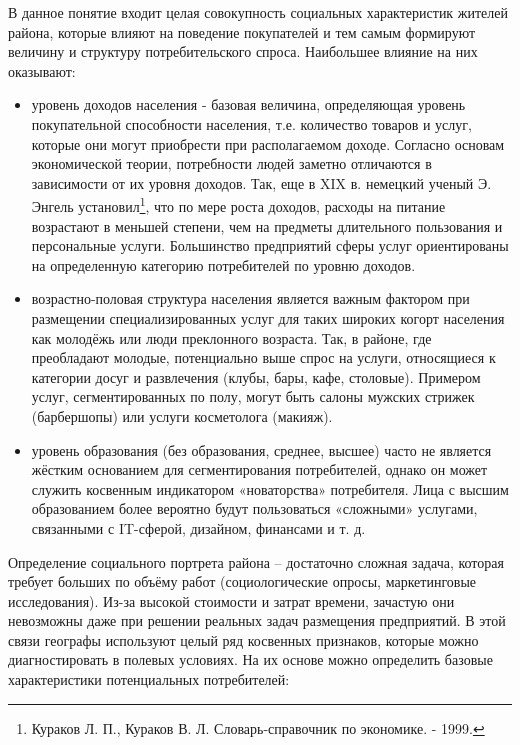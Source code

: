 \documentclass[
  11pt,
  russian,
]{book}
\begin{document}
В данное понятие входит целая совокупность социальных характеристик жителей района, которые влияют на
поведение покупателей и тем самым формируют величину и структуру потребительского спроса. Наибольшее влияние на них оказывают:

\begin{itemize}
\item
  уровень доходов населения - базовая величина, определяющая уровень покупательной способности населения, т.е. количество
  товаров и услуг, которые они могут приобрести при располагаемом доходе.
  Согласно основам экономической теории, потребности людей заметно отличаются в зависимости от их уровня доходов. Так, еще в XIX в.
  немецкий ученый Э. Энгель установил\footnote{Кураков Л. П., Кураков В. Л. Словарь-справочник по экономике. - 1999.}, что по мере роста доходов, расходы на питание возрастают в меньшей степени, чем на предметы длительного пользования и персональные услуги. Большинство предприятий сферы услуг ориентированы на определенную категорию потребителей по уровню доходов.
\item
  возрастно-половая структура населения является важным фактором при размещении специализированных услуг для таких
  широких когорт населения как молодёжь или люди преклонного возраста. Так, в районе, где преобладают молодые, потенциально выше спрос на услуги, относящиеся к категории досуг и развлечения (клубы, бары, кафе, столовые). Примером услуг,
  сегментированных по полу, могут быть салоны мужских стрижек (барбершопы) или услуги косметолога (макияж).
\item
  уровень образования (без образования, среднее, высшее) часто не является жёстким основанием для сегментирования
  потребителей, однако он может служить косвенным индикатором «новаторства» потребителя. Лица с высшим образованием более вероятно будут пользоваться «сложными» услугами, связанными с IT-сферой, дизайном, финансами и т. д.
\end{itemize}

Определение социального портрета района -- достаточно сложная задача, которая требует больших по объёму работ (социологические опросы, маркетинговые исследования). Из-за высокой стоимости и затрат времени, зачастую они невозможны даже при решении реальных задач размещения предприятий. В этой связи географы используют целый ряд косвенных признаков, которые можно диагностировать в полевых условиях. На их основе можно определить базовые характеристики потенциальных потребителей:
\end{document}
